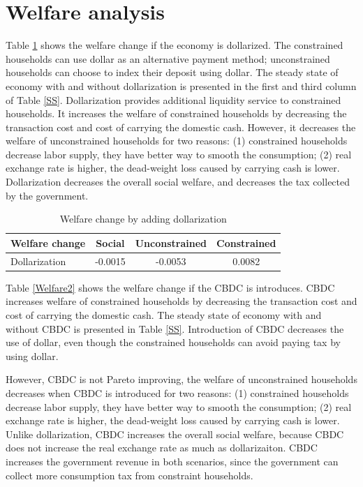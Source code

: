 \documentclass[12pt]{article}
\begin{document}
\section{Welfare analysis}
Table \ref{Welfare1} shows the welfare change if the economy is dollarized. The constrained households can use dollar as an alternative payment method; unconstrained households can choose to index their deposit using dollar. The steady state of economy with and without dollarization is presented in the first and third column of Table \ref{SS}. Dollarization provides additional liquidity service to constrained households. It increases the welfare of constrained households by decreasing the transaction cost and cost of carrying the domestic cash. However, it decreases the welfare of unconstrained households for two reasons:  (1) constrained households decrease labor supply, they have better way to smooth the consumption; (2) real exchange rate is higher, the dead-weight loss caused by carrying cash is lower. Dollarization decreases the overall social welfare, and decreases the tax collected by the government. 
\begin{table}[h!]
\centering
\begin{tabular}{lccc}
\hline\hline
Welfare change & Social  & Unconstrained & Constrained  \\\hline
Dollarization & -0.0015 &  -0.0053 &   0.0082 \\\hline        
\end{tabular}
\caption{Welfare change by adding dollarization}
\label{Welfare1}
\end{table}

Table \ref{Welfare2} shows the welfare change if the CBDC is introduces. CBDC increases welfare of constrained households by decreasing the transaction cost and cost of carrying the domestic cash. The steady state of economy with and without CBDC is presented in Table \ref{SS}. Introduction of CBDC decreases the use of dollar, even though the constrained households can avoid paying tax by using dollar. 

However, CBDC is not Pareto improving, the welfare of unconstrained households decreases when CBDC is introduced for two reasons:   (1) constrained households decrease labor supply, they have better way to smooth the consumption; (2) real exchange rate is higher, the dead-weight loss caused by carrying cash is lower. Unlike dollarization, CBDC increases the overall social welfare, because CBDC does not increase the real exchange rate as much as dollarizaiton. CBDC increases the government revenue in both scenarios, since the government can collect more consumption tax from constraint households. 
\end{document}
